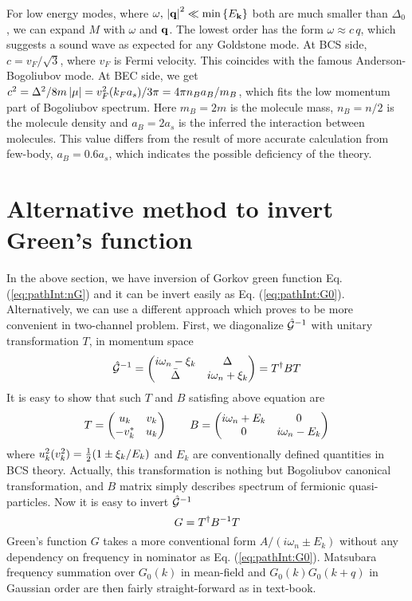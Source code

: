 For low energy modes, where $\omega,\,\left\lvert{\ensuremath{\mathbf{q}}}\right\rvert^{2}\ll\min\left\{E_{\mathbf{k}}\right\}$ both are much smaller than $\Delta_{0}$, we can expand $M$ with $\omega$ and $\mathbf{q}$.  The lowest order has the form $\omega\approx{}c\,q$, which suggests a sound wave as expected for any Goldstone mode.  At BCS side, $c=v_{F}/\sqrt{3}$, where $v_{F}$ is Fermi velocity.  This coincides with the famous Anderson-Bogoliubov mode.  At BEC side, we get $c^{2}=\Delta^{2}/8m\left\lvert{\mu}\right\rvert=v_{F}^{2}(k_{F}a_{s})/3\pi=4\pi{}n_{B}a_{B}/m_{B}$, which fits the low momentum part of Bogoliubov spectrum.  Here $m_{B}=2m$ is the molecule mass, $n_{B}=n/2$ is the molecule density and $a_{B}=2a_{s}$ is the inferred the interaction between molecules.  This value differs from the result of more accurate calculation from few-body, $a_{B}=0.6a_{s}$, which indicates the possible deficiency of the theory. 


\section{Alternative method to invert Green's function\label{sec:diagonalizeGreen1}}
In the above section, we have inversion of Gorkov green function Eq. (\ref{eq:pathInt:nG}) and it can be invert easily as Eq. (\ref{eq:pathInt:G0}).   Alternatively, we can use a different approach which proves to be more convenient in two-channel problem.  First, we diagonalize $\hat{\mathcal{G}}^{-1}$ with unitary transformation $T$, in momentum space
\begin{equation}
\hat{\mathcal{G}}^{-1}=\begin{pmatrix}i\omega_{n}-\xi_{k}&\Delta\\\bar\Delta&i\omega_{n}+\xi_{k}\end{pmatrix}=T^{\dagger}BT
\end{equation}
It is easy to show that such $T$ and $B$ satisfing above equation are
\begin{equation}
T=\begin{pmatrix}u_{k}&v_{k}\\-v_{k}^{*}&u_{k}\end{pmatrix}\qquad{}B=\begin{pmatrix}i\omega_{n}+E_{k}&0\\0&i\omega_{n}-E_{k}\end{pmatrix}
\end{equation}
where $u_{k}^{2}(v_{k}^{2})=\frac{1}{2}(1\pm\xi_{k}/E_{k})$ and $E_{k}$ are conventionally defined quantities in BCS theory.   Actually, this transformation is nothing but Bogoliubov canonical transformation, and $B$ matrix simply describes spectrum of fermionic quasi-particles.  Now it is easy to invert $\hat{\mathcal{G}}^{-1}$
\begin{equation}
G=T^{\dagger}B^{-1}T
\end{equation}
Green's function $G$ takes a more conventional form $A/(i\omega_{n}\pm{}E_{k})$ without any dependency on frequency in nominator as Eq. (\ref{eq:pathInt:G0}). Matsubara frequency summation over $G_{0}(k)$ in mean-field and $G_{0}(k)G_{0}(k+q)$ in Gaussian order are then fairly straight-forward as in text-book.  
